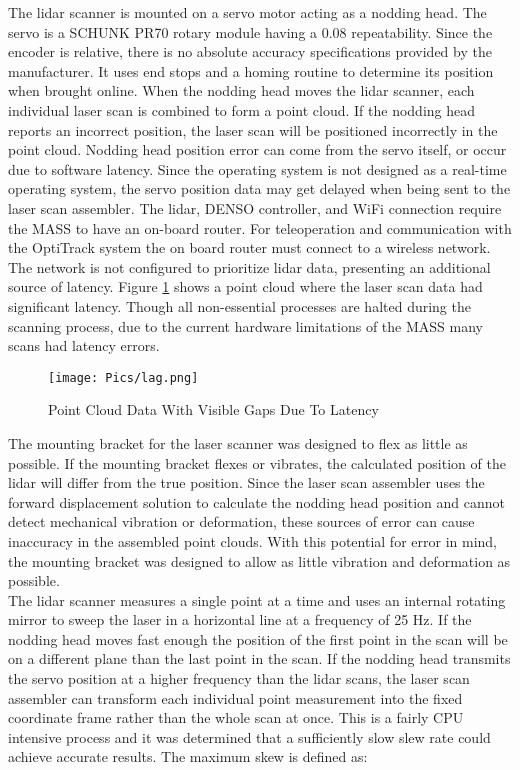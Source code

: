 The \acrshort{lidar} scanner is mounted on a servo motor acting as a nodding head. The servo is a SCHUNK PR70 rotary module having a 0.08\degree\hspace{0pt} repeatability. Since the encoder is relative, there is no absolute accuracy specifications provided by the manufacturer. It uses end stops and a homing routine to determine its position when brought online. When the nodding head moves the \acrshort{lidar} scanner, each individual laser scan is combined to form a point cloud. If the nodding head reports an incorrect position, the laser scan will be positioned incorrectly in the point cloud. Nodding head position error can come from the servo itself, or occur due to software latency. Since the operating system is not designed as a real-time operating system, the servo position data may get delayed when being sent to the laser scan assembler. The \acrshort{lidar}, DENSO controller, and WiFi connection require the MASS to have an on-board router. For teleoperation and communication with the OptiTrack system the on board router must connect to a wireless network. The network is not configured to prioritize \acrshort{lidar} data, presenting an additional source of latency. Figure \ref{fig:headlag} shows a point cloud where the laser scan data had significant latency. Though all non-essential processes are halted during the scanning process, due to the current hardware limitations of the MASS many scans had latency errors.\\
\clearpage
\begin{figure}
    \centering
    \texttt{[image: Pics/lag.png]}
    \caption{Point Cloud Data With Visible Gaps Due To Latency}
    \label{fig:headlag}
\end{figure}
The mounting bracket for the laser scanner was designed to flex as little as possible. If the mounting bracket flexes or vibrates, the calculated position of the \acrshort{lidar} will differ from the true position. Since the laser scan assembler uses the forward displacement solution to calculate the nodding head position and cannot detect mechanical vibration or deformation, these sources of error can cause inaccuracy in the assembled point clouds. With this potential for error in mind, the mounting bracket was designed to allow as little vibration and deformation as possible.\\

The \acrshort{lidar} scanner measures a single point at a time and uses an internal rotating mirror to sweep the laser in a horizontal line at a frequency of 25 Hz. If the nodding head moves fast enough the position of the first point in the scan will be on a different plane than the last point in the scan. If the nodding head transmits the servo position at a higher frequency than the \acrshort{lidar} scans, the laser scan assembler can transform each individual point measurement into the fixed coordinate frame rather than the whole scan at once. This is a fairly CPU intensive process and it was determined that a sufficiently slow slew rate could achieve accurate results. The maximum skew is defined as:


